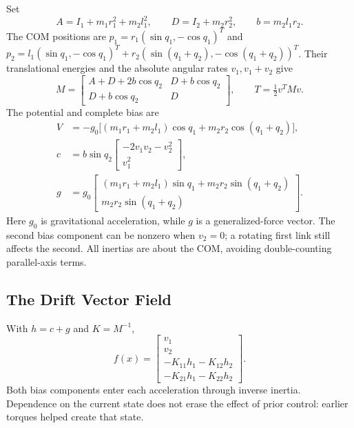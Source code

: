 Set
\[
 A=I_1+m_1r_1^2+m_2l_1^2,\qquad D=I_2+m_2r_2^2,\qquad b=m_2l_1r_2.
\]
The COM positions are $p_1=r_1(\sin q_1,-\cos q_1)^T$ and $p_2=l_1(\sin q_1,-\cos q_1)^T+r_2(\sin(q_1+q_2),-\cos(q_1+q_2))^T$. Their translational energies and the absolute angular rates $v_1,v_1+v_2$ give
\[
 M=\begin{bmatrix}A+D+2b\cos q_2&D+b\cos q_2\\D+b\cos q_2&D\end{bmatrix},
 \qquad T=\tfrac12 v^TMv.
\]
The potential and complete bias are
\[
 \begin{aligned}
 V&=-g_0\big[(m_1r_1+m_2l_1)\cos q_1+m_2r_2\cos(q_1+q_2)\big],\\
 c&=b\sin q_2\begin{bmatrix}-2v_1v_2-v_2^2\\v_1^2\end{bmatrix},\\
 g&=g_0\begin{bmatrix}(m_1r_1+m_2l_1)\sin q_1+m_2r_2\sin(q_1+q_2)\\m_2r_2\sin(q_1+q_2)\end{bmatrix}.
 \end{aligned}
\]
Here $g_0$ is gravitational acceleration, while $g$ is a generalized-force vector. The second bias component can be nonzero when $v_2=0$; a rotating first link still affects the second. All inertias are about the COM, avoiding double-counting parallel-axis terms.

\subsection*{The Drift Vector Field}
With $h=c+g$ and $K=M^{-1}$,
\begin{equation}
 f(x)=\begin{bmatrix}v_1\\v_2\\-K_{11}h_1-K_{12}h_2\\-K_{21}h_1-K_{22}h_2\end{bmatrix}.
\label{eq:ch05_drift_vector}
\end{equation}
Both bias components enter each acceleration through inverse inertia. Dependence on the current state does not erase the effect of prior control: earlier torques helped create that state.

